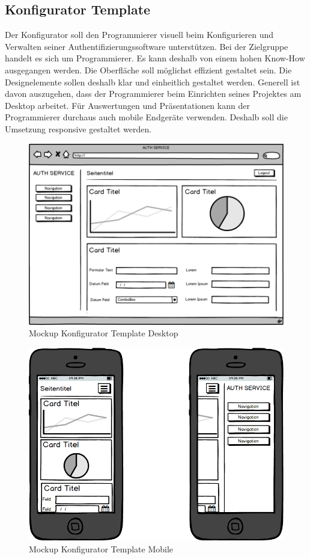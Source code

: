 \hypertarget{konfigurator-template}{\subsection{Konfigurator
Template}\label{konfigurator-template}}

Der Konfigurator soll den Programmierer visuell beim Konfigurieren und
Verwalten seiner Authentifizierungssoftware unterstützen. Bei der
Zielgruppe handelt es sich um Programmierer. Es kann deshalb von einem
hohen Know-How ausgegangen werden. Die Oberfläche soll möglichst
effizient gestaltet sein. Die Designelemente sollen deshalb klar und
einheitlich gestaltet werden. Generell ist davon auszugehen, dass der
Programmierer beim Einrichten seines Projektes am Desktop arbeitet. Für
Auswertungen und Präsentationen kann der Programmierer durchaus auch
mobile Endgeräte verwenden. Deshalb soll die Umsetzung responsive
gestaltet werden.

\begin{figure}[htbp]
\centering
\includegraphics{images/mockups/General.png}
\caption{Mockup Konfigurator Template Desktop}
\end{figure}

\newpage

\begin{figure}[htbp]
\centering
\includegraphics{images/mockups/Mobile.png}
\caption{Mockup Konfigurator Template Mobile}
\end{figure}

